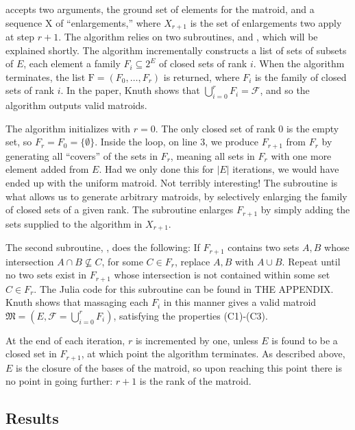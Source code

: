 accepts two arguments, the ground set of elements for the matroid, and a sequence $\mathrm{X}$ of ``enlargements,'' where $X_{r+1}$ is the set of enlargements two apply at step $r+1$. The algorithm relies on two subroutines,  and , which will be explained shortly. The algorithm incrementally constructs a list of sets of subsets of $E$, each element a family $F_i \subseteq 2^E$ of closed sets of rank $i$. When the algorithm terminates, the list $\mathrm{F} = (F_0, \ldots, F_r)$ is returned, where $F_i$ is the family of closed sets of rank $i$. In the paper, Knuth shows that $\bigcup_{i=0}^r F_i = \mathcal{F}$, and so the algorithm outputs valid matroids.

The algorithm initializes with $r = 0$. The only closed set of rank 0 is the empty set, so $F_r = F_0 = \{ \emptyset \}$. Inside the loop, on line 3, we produce $F_{r+1}$ from $F_r$ by generating all ``covers'' of the sets in $F_r$, meaning all sets in $F_r$ with one more element added from $E$. Had we only done this for $|E|$ iterations, we would have ended up with the uniform matroid. Not terribly interesting! The  subroutine is what allows us to generate arbitrary matroids, by selectively enlarging the family of closed sets of a given rank. The subroutine enlarges $F_{r+1}$ by simply adding the sets supplied to the algorithm in $X_{r+1}$.

The second subroutine, , does the following: If $F_{r+1}$ contains two sets $A,B$ whose intersection $A \cap B \not \subseteq C$, for some $C \in F_{r}$, replace $A,B$ with $A \cup B$. Repeat until no two sets exist in $F_{r+1}$ whose intersection is not contained within some set $C \in F_{r}$. The Julia code for this subroutine can be found in THE APPENDIX. Knuth shows that massaging each $F_{i}$ in this manner gives a valid matroid $\mathfrak{M} = (E, \mathcal{F} = \bigcup_{i=0}^r F_i)$, satisfying the properties (C1)-(C3).

At the end of each iteration, $r$ is incremented by one, unless $E$ is found to be a closed set in $F_{r+1}$, at which point the algorithm terminates. As described above, $E$ is the closure of the bases of the matroid, so upon reaching this point there is no point in going further: $r+1$ is the rank of the matroid.

\skelpar


\subsection*{Results}
\begin{table*}[ht]
  \centering
  \skelcaption[1]{}
  \skeltabular[10]
\end{table*}
\skelpars[4]{}